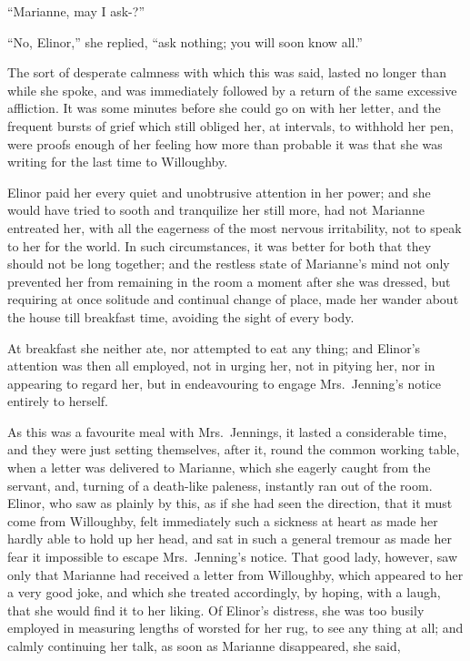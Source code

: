 \documentclass{article}
\begin{document}
``Marianne, may I ask-?''

``No, Elinor,'' she replied, ``ask nothing; you will
soon know all.''

The sort of desperate calmness with which this was said,
lasted no longer than while she spoke, and was immediately
followed by a return of the same excessive affliction.
It was some minutes before she could go on with her letter,
and the frequent bursts of grief which still obliged her,
at intervals, to withhold her pen, were proofs enough of her
feeling how more than probable it was that she was writing
for the last time to Willoughby.

Elinor paid her every quiet and unobtrusive attention
in her power; and she would have tried to sooth and
tranquilize her still more, had not Marianne entreated her,
with all the eagerness of the most nervous irritability,
not to speak to her for the world.  In such circumstances,
it was better for both that they should not be long together;
and the restless state of Marianne's mind not only prevented
her from remaining in the room a moment after she was dressed,
but requiring at once solitude and continual change of place,
made her wander about the house till breakfast time, avoiding
the sight of every body.

At breakfast she neither ate, nor attempted to eat
any thing; and Elinor's attention was then all employed,
not in urging her, not in pitying her, nor in appearing
to regard her, but in endeavouring to engage Mrs.\ Jenning's
notice entirely to herself.

As this was a favourite meal with Mrs.\ Jennings,
it lasted a considerable time, and they were just setting
themselves, after it, round the common working table, when a
letter was delivered to Marianne, which she eagerly caught
from the servant, and, turning of a death-like paleness,
instantly ran out of the room.  Elinor, who saw as plainly
by this, as if she had seen the direction, that it must
come from Willoughby, felt immediately such a sickness
at heart as made her hardly able to hold up her head,
and sat in such a general tremour as made her fear it
impossible to escape Mrs.\ Jenning's notice.  That good lady,
however, saw only that Marianne had received a letter
from Willoughby, which appeared to her a very good joke,
and which she treated accordingly, by hoping, with a laugh,
that she would find it to her liking.  Of Elinor's distress,
she was too busily employed in measuring lengths of worsted
for her rug, to see any thing at all; and calmly continuing
her talk, as soon as Marianne disappeared, she said,
\end{document}
